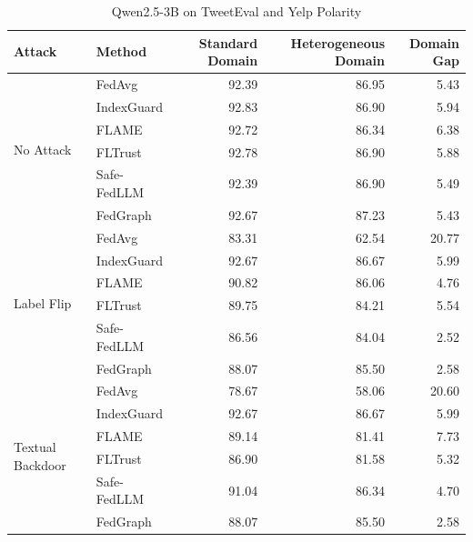 \documentclass[10pt]{article}
\begin{document}
\begin{table}[htbp]
\centering
\caption{Qwen2.5-3B on TweetEval and Yelp Polarity}
\label{tab:qwen3_tweet_yelp}
\small
\begin{tabular}{llrrr}
\toprule
Attack & Method & Standard Domain & Heterogeneous Domain & Domain Gap \\
\midrule
\multirow{6}{*}{No Attack} & FedAvg & 92.39 & 86.95 & 5.43 \\
 & IndexGuard & 92.83 & 86.90 & 5.94 \\
 & FLAME & 92.72 & 86.34 & 6.38 \\
 & FLTrust & 92.78 & 86.90 & 5.88 \\
 & Safe-FedLLM & 92.39 & 86.90 & 5.49 \\
 & FedGraph & 92.67 & 87.23 & 5.43 \\
\midrule
\multirow{6}{*}{Label Flip} & FedAvg & 83.31 & 62.54 & 20.77 \\
 & IndexGuard & 92.67 & 86.67 & 5.99 \\
 & FLAME & 90.82 & 86.06 & 4.76 \\
 & FLTrust & 89.75 & 84.21 & 5.54 \\
 & Safe-FedLLM & 86.56 & 84.04 & 2.52 \\
 & FedGraph & 88.07 & 85.50 & 2.58 \\
\midrule
\multirow{6}{*}{Textual Backdoor} & FedAvg & 78.67 & 58.06 & 20.60 \\
 & IndexGuard & 92.67 & 86.67 & 5.99 \\
 & FLAME & 89.14 & 81.41 & 7.73 \\
 & FLTrust & 86.90 & 81.58 & 5.32 \\
 & Safe-FedLLM & 91.04 & 86.34 & 4.70 \\
 & FedGraph & 88.07 & 85.50 & 2.58 \\
\bottomrule
\end{tabular}
\end{table}
\end{document}
